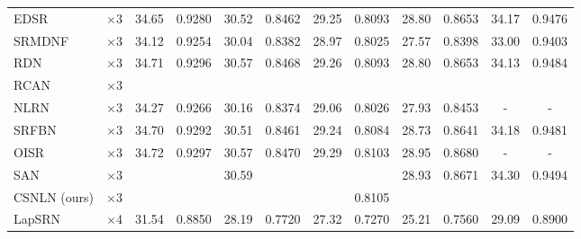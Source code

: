 \documentclass[10pt,twocolumn,letterpaper]{article}
\begin{document}
\begin{table*}[thbp]
\begin{center}
\begin{tabular}{|l|c|c|c|c|c|c|c|c|c|c|c|}
\\
EDSR~\cite{lim2017enhanced} & $\times$3 
& 34.65
 & 0.9280
  & 30.52
   & 0.8462
    & 29.25
     & 0.8093
      & 28.80
       & 0.8653
        & 34.17
         & 0.9476
                   
\\
SRMDNF~\cite{zhang2018learning} & $\times$3 
& 34.12
 & 0.9254
  & 30.04
   & 0.8382
    & 28.97
     & 0.8025
      & 27.57
       & 0.8398
        & 33.00
         & 0.9403
                   
\\
RDN~\cite{zhang2018residual} & $\times$3 
& 34.71
 & 0.9296
  & 30.57
   & 0.8468
    & 29.26
     & 0.8093
      & 28.80
       & 0.8653
        & 34.13
         & 0.9484
         
\\
RCAN~\cite{zhang2018image}& $\times$3 
& \color{blue}{34.74}
 &\color{blue}{0.9299}
  & \color{blue}{30.65}
   & \color{red}{0.8482}
    & \color{blue}{29.32}
     & \color{blue}{0.8111}
      & \color{blue}{29.09}
       &\color{blue}{0.8702}
        & \color{blue}{34.44}
         &\color{blue}{0.9499}
         
\\
NLRN~\cite{liu2018non}& $\times$3 
& {34.27}
 &{0.9266}
  & {30.16}
   &{0.8374}
    & {29.06}
     & {0.8026}
      & {27.93}
       & {0.8453}
        & {-}
         & {-}
\\
SRFBN~\cite{li2019feedback}& $\times$3 
& {34.70}
 &{0.9292}
  & {30.51}
   &{0.8461}
    & {29.24}
     & {0.8084}
      & {28.73}
       & {0.8641}
        & {34.18}
         & {0.9481}
\\
OISR~\cite{he2019ode}& $\times$3 
& {34.72}
 &{0.9297}
  & {30.57}
   &{0.8470}
    & {29.29}
     & {0.8103}
      & {28.95}
       & {0.8680}
        & {-}
         & {-}
\\
SAN~\cite{dai2019second} & $\times$3 
& \color{red}{34.75}
 &\color{red}{0.9300}
  & {30.59}
   &\color{blue}{0.8476}
    &\color{red}{29.33}
     & \color{red}{0.8112}
      & {28.93}
       & {0.8671}
        & {34.30}
         & {0.9494}
        
\\
CSNLN (ours) & $\times$3
& \color{blue}{34.74}
 & \color{red}{0.9300}
  & \color{red}{30.66}
   & \color{red}{0.8482}
    & \color{red}{29.33}
     & {0.8105}
      & \color{red}{29.13}
       & \color{red}{0.8712}
        & \color{red}{34.45}
         & \color{red}{0.9502}
\\
\hline
\hline
LapSRN~\cite{lai2017deep} & $\times$4 
& 31.54
 & 0.8850
  & 28.19
   & 0.7720
    & 27.32
     & 0.7270
      & 25.21
       & 0.7560
        & 29.09
         & 0.8900
                   

\end{tabular}
\end{center}
\end{table*}
\end{document}
